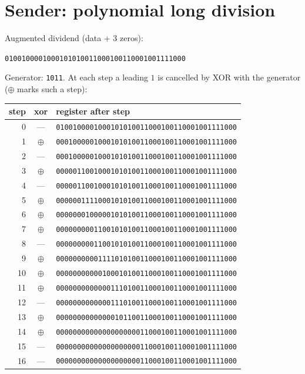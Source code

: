 \documentclass[11pt,a4paper]{article}
\begin{document}
\section{Sender: polynomial long division}
Augmented dividend (data + 3 zeros):
\begin{center}\texttt{0100100001000101010011000100110001001111000}\end{center}
Generator: \texttt{1011}. At each step a leading $1$ is cancelled by XOR with the generator ($\oplus$ marks such a step):
\begin{center}
\footnotesize
\begin{tabular}{rcl}
\toprule
step & xor & register after step \\
\midrule
    0 & --- & \texttt{0100100001000101010011000100110001001111000} \\
    1 & $\oplus$ & \texttt{0001000001000101010011000100110001001111000} \\
    2 & --- & \texttt{0001000001000101010011000100110001001111000} \\
    3 & $\oplus$ & \texttt{0000011001000101010011000100110001001111000} \\
    4 & --- & \texttt{0000011001000101010011000100110001001111000} \\
    5 & $\oplus$ & \texttt{0000001111000101010011000100110001001111000} \\
    6 & $\oplus$ & \texttt{0000000100000101010011000100110001001111000} \\
    7 & $\oplus$ & \texttt{0000000001100101010011000100110001001111000} \\
    8 & --- & \texttt{0000000001100101010011000100110001001111000} \\
    9 & $\oplus$ & \texttt{0000000000111101010011000100110001001111000} \\
    10 & $\oplus$ & \texttt{0000000000010001010011000100110001001111000} \\
    11 & $\oplus$ & \texttt{0000000000000111010011000100110001001111000} \\
    12 & --- & \texttt{0000000000000111010011000100110001001111000} \\
    13 & $\oplus$ & \texttt{0000000000000010110011000100110001001111000} \\
    14 & $\oplus$ & \texttt{0000000000000000000011000100110001001111000} \\
    15 & --- & \texttt{0000000000000000000011000100110001001111000} \\
    16 & --- & \texttt{0000000000000000000011000100110001001111000} \\

\end{tabular}
\end{center}
\end{document}
